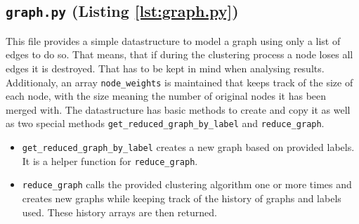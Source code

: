 \subsection*{{\Large\texttt{graph.py}} (Listing \ref{lst:graph.py})}
  This file provides a simple datastructure to model a graph using only a list of edges to do so. That means, that if during the clustering process a node loses all edges it is destroyed. That has to be kept in mind when analysing results. Additionaly, an array \texttt{node\_weights} is maintained that keeps track of the size of each node, with the size meaning the number of original nodes it has been merged with. The datastructure has basic methods to create and copy it as well as two special methods \texttt{get\_reduced\_graph\_by\_label} and \texttt{reduce\_graph}.
  \begin{itemize}
    \item \texttt{get\_reduced\_graph\_by\_label} creates a new graph based on provided labels. It is a helper function for \texttt{reduce\_graph}.
    \item \texttt{reduce\_graph} calls the provided clustering algorithm one or more times and creates new graphs while keeping track of the history of graphs and labels used. These history arrays are then returned.
  \end{itemize}
